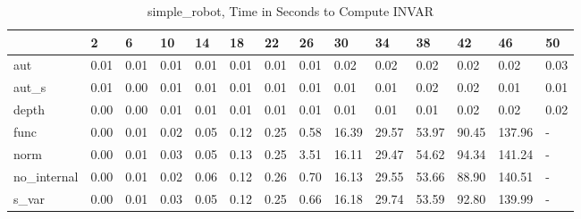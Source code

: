 \begin{table}
\caption{simple_robot, Time in Seconds to Compute INVAR}
\label{simple_robot_INVAR_time}
\begin{tabular}{llllllllllllll}
\toprule
 & 2 & 6 & 10 & 14 & 18 & 22 & 26 & 30 & 34 & 38 & 42 & 46 & 50 \\
\midrule
aut & 0.01 & 0.01 & 0.01 & 0.01 & 0.01 & 0.01 & 0.01 & 0.02 & 0.02 & 0.02 & 0.02 & 0.02 & 0.03 \\
aut_s & 0.01 & 0.00 & 0.01 & 0.01 & 0.01 & 0.01 & 0.01 & 0.01 & 0.01 & 0.02 & 0.02 & 0.01 & 0.01 \\
depth & 0.00 & 0.00 & 0.01 & 0.01 & 0.01 & 0.01 & 0.01 & 0.01 & 0.01 & 0.01 & 0.02 & 0.02 & 0.02 \\
func & 0.00 & 0.01 & 0.02 & 0.05 & 0.12 & 0.25 & 0.58 & 16.39 & 29.57 & 53.97 & 90.45 & 137.96 & - \\
norm & 0.00 & 0.01 & 0.03 & 0.05 & 0.13 & 0.25 & 3.51 & 16.11 & 29.47 & 54.62 & 94.34 & 141.24 & - \\
no_internal & 0.00 & 0.01 & 0.02 & 0.06 & 0.12 & 0.26 & 0.70 & 16.13 & 29.55 & 53.66 & 88.90 & 140.51 & - \\
s_var & 0.00 & 0.01 & 0.03 & 0.05 & 0.12 & 0.25 & 0.66 & 16.18 & 29.74 & 53.59 & 92.80 & 139.99 & - \\
\bottomrule
\end{tabular}
\end{table}
